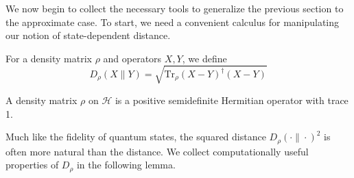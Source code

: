 We now begin to collect the necessary tools to generalize the previous section to the approximate case. To start, we need a convenient calculus for manipulating our notion of state-dependent distance.

\begin{definition}\label{def:state-distance}
For a density matrix $\rho$ and operators $X, Y$, we define
\begin{equation}
D_\rho(X \| Y) = \sqrt{\mathrm{Tr}_\rho(X-Y)^\dagger(X-Y)}
\end{equation}
\end{definition}

\begin{definition}\label{def:density-matrix}
A density matrix $\rho$ on $\mathcal{H}$ is a positive semidefinite Hermitian operator with trace 1.
\end{definition}

Much like the fidelity of quantum states, the squared distance $D_\rho(\cdot \| \cdot)^2$ is often more natural than the distance. We collect computationally useful properties of $D_\rho$ in the following lemma.

